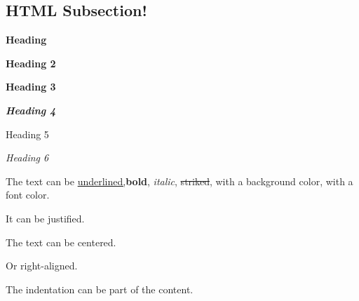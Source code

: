 \documentclass[letter,titlepage,oneside,11pt]{report}%
\begin{document}
\subsection{HTML Subsection!}%
\par%
\par%
\begin{FlushLeft}%
{\huge \textbf{Heading}}%
\end{FlushLeft}%
\par%
\begin{FlushLeft}%
{\LARGE \textbf{Heading 2}}%
\end{FlushLeft}%
\par%
\begin{FlushLeft}%
{\Large \textbf{Heading 3}}%
\end{FlushLeft}%
\par%
\begin{FlushLeft}%
{\large \textit{\textbf{Heading 4}}}%
\end{FlushLeft}%
\par%
\begin{FlushLeft}%
{\large Heading 5}%
\end{FlushLeft}%
\par%
\begin{FlushLeft}%
{\large \textit{Heading 6}}%
\end{FlushLeft}%
\par%
\begin{FlushLeft}%
The text can be \underline{underlined,}\textbf{bold}, \textit{italic}, \sout{striked}, with a \colorbox[rgb]{0.8,0.8,0.0}{background color}, with a {\color[rgb]{0.5568627450980392,0.26666666666666666,0.6784313725490196}font color.}%
\end{FlushLeft}%
\par%
\begin{justify}%
It can be justified.%
\end{justify}%
\par%
\begin{Center}%
The text can be centered.%
\end{Center}%
\par%
\begin{FlushRight}%
Or right-aligned.%
\end{FlushRight}%
\par%
\begin{FlushLeft}%
\begin{adjustwidth}{40pt}{}%
The indentation can be part of the content.%
\end{adjustwidth}%
\end{FlushLeft}%
\end{document}
